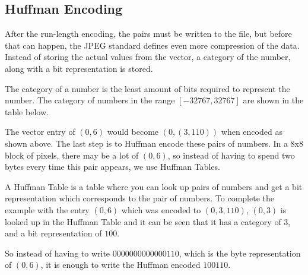 \begin{infobox}
\vspace{4mm}
\subsection{Huffman Encoding}
\vspace{-2.5mm}
After the run-length encoding, the pairs must be written to the file, but before that can happen, the JPEG standard defines even more compression of the data. Instead of storing the actual values from the vector, a category of the number, along with a bit representation is stored. 

The category of a number is the least amount of bits required to represent the number. The category of numbers in the range $[-32767, 32767]$ are shown in the table below.

\begin{centering}
\end{centering}

The vector entry of $(0,6)$ would become $(0,(3,110))$ when encoded as shown above. The last step is to Huffman encode these pairs of numbers.
In a 8x8 block of pixels, there may be a lot of $(0,6)$, so instead of having to spend two bytes every time this pair appears, we use Huffman Tables. 

A Huffman Table is a table where you can look up pairs of numbers and get a bit representation which corresponds to the pair of numbers. To complete the example with the entry $(0,6)$ which was encoded to $(0,3,110)$, $(0,3)$ is looked up in the Huffman Table and it can be seen that it has a category of $3$, and a bit representation of $100$. 

So instead of having to write $0000 0000 0000 0110$, which is the byte representation of $(0,6)$, it is enough to write the Huffman encoded $100110$.


\end{infobox}
